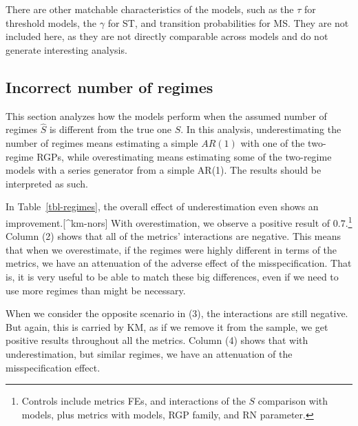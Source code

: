 \documentclass[
  letterpaper,
  DIV=11,
  numbers=noendperiod]{scrartcl}
\numberwithin{equation}{section}
\numberwithin{table}{section}
\numberwithin{figure}{section}
\begin{document}
There are other matchable characteristics of the models, such as the
\(\tau\) for threshold models, the \(\gamma\) for ST, and transition
probabilities for MS. They are not included here, as they are not
directly comparable across models and do not generate interesting
analysis.

\subsection{Incorrect number of regimes}\label{sec-perf-nr}

This section analyzes how the models perform when the assumed number of
regimes \(\hat{S}\) is different from the true one \(S\). In this
analysis, underestimating the number of regimes means estimating a
simple \(AR(1)\) with one of the two-regime RGPs, while overestimating
means estimating some of the two-regime models with a series generator
from a simple AR(1). The results should be interpreted as such.

In Table~\ref{tbl-regimes}, the overall effect of underestimation even
shows an improvement.{[}\^{}km-nors{]} With overestimation, we observe a
positive result of \(0.7\).\footnote{Controls include metrics FEs, and
  interactions of the \(S\) comparison with models, plus metrics with
  models, RGP family, and RN parameter.} Column (2) shows that all of
the metrics' interactions are negative. This means that when we
overestimate, if the regimes were highly different in terms of the
metrics, we have an attenuation of the adverse effect of the
misspecification. That is, it is very useful to be able to match these
big differences, even if we need to use more regimes than might be
necessary.

When we consider the opposite scenario in (3), the interactions are
still negative. But again, this is carried by KM, as if we remove it
from the sample, we get positive results throughout all the metrics.
Column (4) shows that with underestimation, but similar regimes, we have
an attenuation of the misspecification effect.

\begin{table}[!htbp]

\caption{\label{tbl-regimes}Mis-specification of the number of regimes}

\centering{



}

\end{table}%
\end{document}
